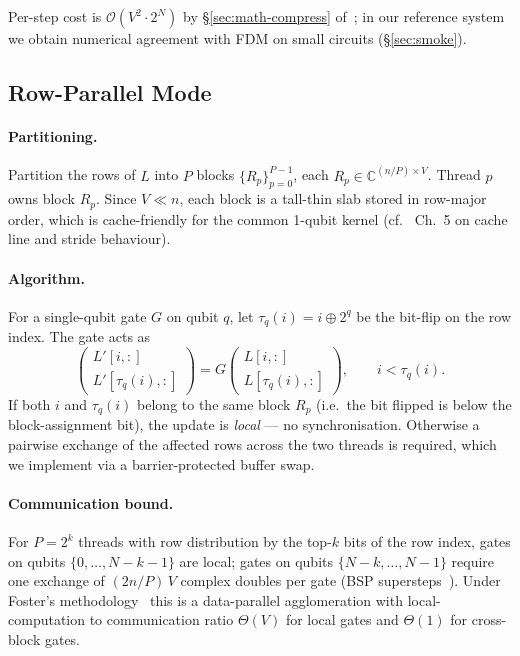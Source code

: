\documentclass[11pt,a4paper]{article}
\begin{document}
Per-step cost is $\mathcal{O}(V^2\cdot 2^N)$ by \S\ref{sec:math-compress}
of~\cite{chen2021lret}; in our reference system we obtain numerical
agreement with FDM on small circuits (\S\ref{sec:smoke}).

\subsection{Row-Parallel Mode}
\label{sec:row-parallel}

\paragraph{Partitioning.}
Partition the rows of $L$ into $P$ blocks $\{R_p\}_{p=0}^{P-1}$, each
$R_p \in \mathbb{C}^{(n/P)\times V}$. Thread $p$ owns block $R_p$. Since $V \ll n$, each
block is a tall-thin slab stored in row-major order, which is cache-friendly for the
common 1-qubit kernel (cf.\ \cite{hennessypatterson2017} Ch.\ 5 on cache line and
stride behaviour).

\paragraph{Algorithm.}
For a single-qubit gate $G$ on qubit $q$, let $\tau_q(i) = i \oplus 2^q$ be the
bit-flip on the row index. The gate acts as
\begin{equation}
  \begin{pmatrix} L'[i,:] \\ L'[\tau_q(i),:] \end{pmatrix}
  = G \begin{pmatrix} L[i,:] \\ L[\tau_q(i),:] \end{pmatrix},
  \qquad i < \tau_q(i).
\end{equation}
If both $i$ and $\tau_q(i)$ belong to the same block $R_p$ (i.e.\ the bit flipped
is below the block-assignment bit), the update is \emph{local} --- no synchronisation.
Otherwise a pairwise exchange of the affected rows across the two threads is required,
which we implement via a barrier-protected buffer swap.

\paragraph{Communication bound.}
For $P = 2^k$ threads with row distribution by the top-$k$ bits of the row index,
gates on qubits $\{0, \ldots, N-k-1\}$ are local; gates on qubits $\{N-k,\ldots,N-1\}$
require one exchange of $(2n/P)\,V$ complex doubles per gate (BSP
supersteps~\cite{valiant1990bsp}). Under Foster's methodology~\cite{foster1995} this
is a data-parallel agglomeration with local-computation to communication ratio
$\Theta(V)$ for local gates and $\Theta(1)$ for cross-block gates.
\end{document}
